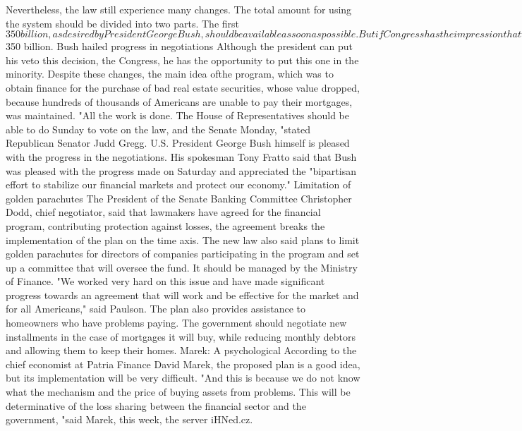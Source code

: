 Nevertheless, the law still experience many changes.
The total amount for using the system should be divided into two parts.
The first $ 350 billion, as desired by President George Bush, should be available as soon as possible.
But if Congress has the impression that the program does not fulfill its function, it has the ability to block the granting of the remaining amount, following two steps: first an additional 100 billion dollars, and then, finally, $ 350 billion.
Bush hailed progress in negotiations
Although the president can put his veto this decision, the Congress, he has the opportunity to put this one in the minority.
Despite these changes, the main idea of ​​the program, which was to obtain finance for the purchase of bad real estate securities, whose value dropped, because hundreds of thousands of Americans are unable to pay their mortgages, was maintained.
"All the work is done.
The House of Representatives should be able to do Sunday to vote on the law, and the Senate Monday, "stated Republican Senator Judd Gregg.
U.S. President George Bush himself is pleased with the progress in the negotiations.
His spokesman Tony Fratto said that Bush was pleased with the progress made on Saturday and appreciated the "bipartisan effort to stabilize our financial markets and protect our economy."
Limitation of golden parachutes
The President of the Senate Banking Committee Christopher Dodd, chief negotiator, said that lawmakers have agreed for the financial program, contributing protection against losses, the agreement breaks the implementation of the plan on the time axis.
The new law also said plans to limit golden parachutes for directors of companies participating in the program and set up a committee that will oversee the fund.
It should be managed by the Ministry of Finance.
"We worked very hard on this issue and have made significant progress towards an agreement that will work and be effective for the market and for all Americans," said Paulson.
The plan also provides assistance to homeowners who have problems paying.
The government should negotiate new installments in the case of mortgages it will buy, while reducing monthly debtors and allowing them to keep their homes.
Marek: A psychological
According to the chief economist at Patria Finance David Marek, the proposed plan is a good idea, but its implementation will be very difficult.
"And this is because we do not know what the mechanism and the price of buying assets from problems.
This will be determinative of the loss sharing between the financial sector and the government, "said Marek, this week, the server iHNed.cz.
